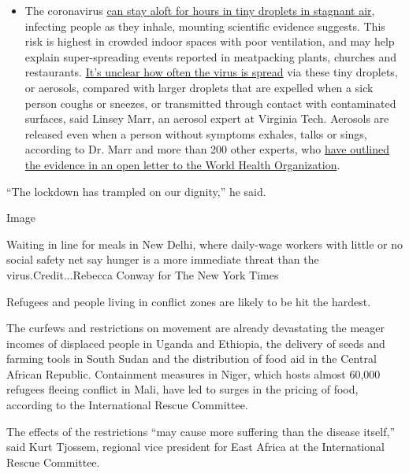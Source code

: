 \begin{itemize}
  \begin{itemize}
  \tightlist
  \item
    The coronavirus
    \href{https://www.nytimes.com/2020/07/04/health/239-experts-with-one-big-claim-the-coronavirus-is-airborne.html?action=click\&pgtype=Article\&state=default\&region=MAIN_CONTENT_3\&context=storylines_faq}{can
    stay aloft for hours in tiny droplets in stagnant air}, infecting
    people as they inhale, mounting scientific evidence suggests. This
    risk is highest in crowded indoor spaces with poor ventilation, and
    may help explain super-spreading events reported in meatpacking
    plants, churches and restaurants.
    \href{https://www.nytimes.com/2020/07/06/health/coronavirus-airborne-aerosols.html?action=click\&pgtype=Article\&state=default\&region=MAIN_CONTENT_3\&context=storylines_faq}{It's
    unclear how often the virus is spread} via these tiny droplets, or
    aerosols, compared with larger droplets that are expelled when a
    sick person coughs or sneezes, or transmitted through contact with
    contaminated surfaces, said Linsey Marr, an aerosol expert at
    Virginia Tech. Aerosols are released even when a person without
    symptoms exhales, talks or sings, according to Dr. Marr and more
    than 200 other experts, who
    \href{https://academic.oup.com/cid/article/doi/10.1093/cid/ciaa939/5867798}{have
    outlined the evidence in an open letter to the World Health
    Organization}.
  \end{itemize}
\end{itemize}

``The lockdown has trampled on our dignity,'' he said.

Image

Waiting in line for meals in New Delhi, where daily-wage workers with
little or no social safety net say hunger is a more immediate threat
than the virus.Credit...Rebecca Conway for The New York Times

Refugees and people living in conflict zones are likely to be hit the
hardest.

The curfews and restrictions on movement are already devastating the
meager incomes of displaced people in Uganda and Ethiopia, the delivery
of seeds and farming tools in South Sudan and the distribution of food
aid in the Central African Republic. Containment measures in Niger,
which hosts almost 60,000 refugees fleeing conflict in Mali, have led to
surges in the pricing of food, according to the International Rescue
Committee.

The effects of the restrictions ``may cause more suffering than the
disease itself,'' said Kurt Tjossem, regional vice president for East
Africa at the International Rescue Committee.

